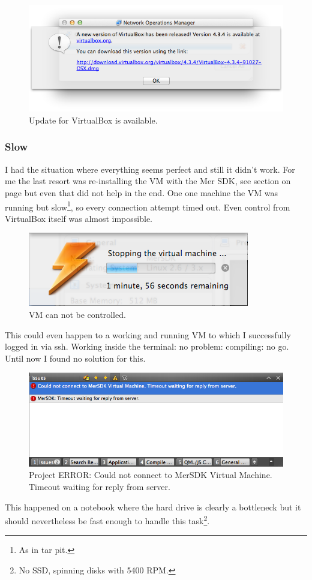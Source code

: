 %
\begin{figure}[H]
  \centering
  \includegraphics[scale=0.6]{../media/gfx/VirtualBox/vboxupateavailable.png} 
  \caption{Update for VirtualBox is available.}
  \label{fig:vboxupateavailable}
\end{figure}
%
%
\subsubsection{Slow}\label{subsubsec:ts:slowmersdk}
%
I had the situation where everything seems perfect and still it didn't work. For me the last resort was re-installing the VM with the Mer SDK, see section  on page \pageref{sec:uninstall} but even that did not help in the end.
%
One one machine the VM was running but slow\footnote{As in tar pit.}, so every connection attempt timed out. Even control from VirtualBox itself was almost impossible.
%
\begin{figure}[H]
  \centering
  \includegraphics[scale=0.6]{../media/gfx/VirtualBox/vboxtarpit.png} 
  \caption{VM can not be controlled.}
  \label{fig:vboxtarpit}
\end{figure}
%
This could even happen to a working and running VM to which I successfully logged in via ssh. Working inside the terminal: no problem: compiling: no go.
Until now I found no solution for this.
%
\begin{figure}[H]
  \centering
  \includegraphics[scale=0.6]{../media/gfx/VirtualBox/MerSDKTimeout.png} 
  \caption{Project ERROR: Could not connect to MerSDK Virtual Machine. Timeout waiting for reply from server.}
  \label{fig:MerSDKTimeout}
\end{figure}
%
This happened on a notebook where the hard drive is clearly a bottleneck but it should nevertheless be fast enough to handle this task\footnote{No SSD, spinning disks with 5400 RPM.}.

